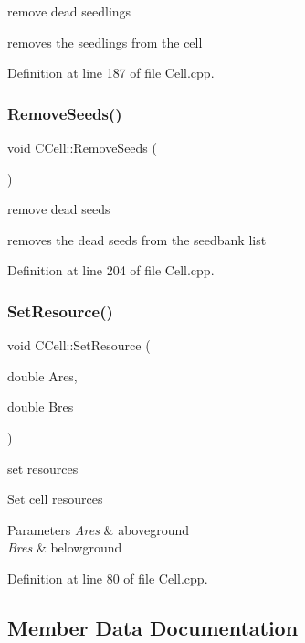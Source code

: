 remove dead seedlings 

removes the seedlings from the cell 

Definition at line 187 of file Cell.\+cpp.

\mbox{\label{class_c_cell_a4e261cc154f9f96eeb96772e354a1b34}} 
\subsubsection{\texorpdfstring{RemoveSeeds()}{RemoveSeeds()}}
{\footnotesize\ttfamily void C\+Cell\+::\+Remove\+Seeds (\begin{DoxyParamCaption}{ }\end{DoxyParamCaption})}



remove dead seeds 

removes the dead seeds from the seedbank list 

Definition at line 204 of file Cell.\+cpp.

\mbox{\label{class_c_cell_a3a37e68bb48fe43cc14f8417ea93327b}} 
\subsubsection{\texorpdfstring{SetResource()}{SetResource()}}
{\footnotesize\ttfamily void C\+Cell\+::\+Set\+Resource (\begin{DoxyParamCaption}\item[{double}]{Ares,  }\item[{double}]{Bres }\end{DoxyParamCaption})}



set resources 

Set cell resources


\begin{DoxyParams}{Parameters}
{\em Ares} & aboveground \\
\hline
{\em Bres} & belowground \\
\hline
\end{DoxyParams}


Definition at line 80 of file Cell.\+cpp.



\subsection{Member Data Documentation}
\mbox{\label{class_c_cell_a26b61055f1bd6e49407af5dafeda7a41}} 
